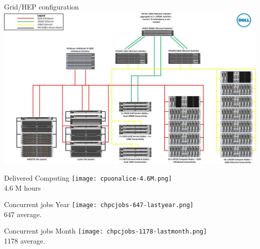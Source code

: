 \documentclass[10pt]{beamer}
\begin{document}
 \begin{frame}{Grid/HEP configuration}
  \includegraphics[scale=0.3]{CHPCConnectivityDiagram.jpg}\\
\end{frame}
\begin{frame}{Delivered Computing}
  \texttt{[image: cpuonalice-4.6M.png]}\\
  4.6 M hours
\end{frame}
\begin{frame}{Concurrent jobs Year}
  \texttt{[image: chpcjobs-647-lastyear.png]}\\
  647 average.
\end{frame}
\begin{frame}{Concurrent jobs Month}
  \texttt{[image: chpcjobs-1178-lastmonth.png]}\\
  1178 average.
\end{frame}
\end{document}

